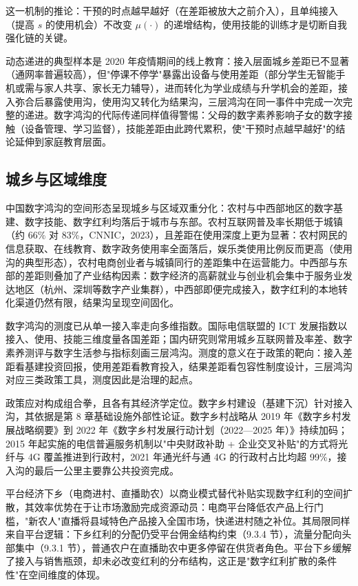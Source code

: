 这一机制的推论：干预的时点越早越好（在差距被放大之前介入），且单纯接入（提高 $s$ 的使用机会）不改变 $\mu(\cdot)$ 的递增结构，使用技能的训练才是切断自我强化链的关键。

动态递进的典型样本是 2020 年疫情期间的线上教育：接入层面城乡差距已不显著（通网率普遍较高），但"停课不停学"暴露出设备与使用差距（部分学生无智能手机或需与家人共享、家长无力辅导），进而转化为学业成绩与升学机会的差距，接入弥合后暴露使用沟，使用沟又转化为结果沟，三层鸿沟在同一事件中完成一次完整的递进。数字鸿沟的代际传递同样值得警惕：父母的数字素养影响子女的数字接触（设备管理、学习监督），技能差距由此跨代累积，使"干预时点越早越好"的结论延伸到家庭教育层面。

\subsection{城乡与区域维度}

中国数字鸿沟的空间形态呈现城乡与区域双重分化：农村与中西部地区的数字基建、数字技能、数字红利均落后于城市与东部。农村互联网普及率长期低于城镇（约 66\% 对 83\%，CNNIC，2023），且差距在使用深度上更为显著：农村网民的信息获取、在线教育、数字政务使用率全面落后，娱乐类使用比例反而更高（使用沟的典型形态），农村电商创业者与城镇同行的差距集中在运营能力。中西部与东部的差距则叠加了产业结构因素：数字经济的高薪就业与创业机会集中于服务业发达地区（杭州、深圳等数字产业集群），中西部即便完成接入，数字红利的本地转化渠道仍然有限，结果沟呈现空间固化。

数字鸿沟的测度已从单一接入率走向多维指数。国际电信联盟的 ICT 发展指数以接入、使用、技能三维度量各国差距；国内研究则常用城乡互联网普及率差、数字素养测评与数字生活参与指标刻画三层鸿沟。测度的意义在于政策的靶向：接入差距看基建投资回报，使用差距看教育投入，结果差距看包容性制度设计，三层鸿沟对应三类政策工具，测度因此是治理的起点。

政策应对构成组合拳，且各有其经济学定位。数字乡村建设（基建下沉）针对接入沟，其依据是第 8 章基础设施外部性论证。数字乡村战略从 2019 年《数字乡村发展战略纲要》到 2022 年《数字乡村发展行动计划（2022—2025 年）》持续加码；2015 年起实施的电信普遍服务机制以"中央财政补助 + 企业交叉补贴"的方式将光纤与 4G 覆盖推进到行政村，2021 年通光纤与通 4G 的行政村占比均超 99\%，接入沟的最后一公里主要靠公共投资完成。

平台经济下乡（电商进村、直播助农）以商业模式替代补贴实现数字红利的空间扩散，其效率优势在于让市场激励完成资源动员：电商平台降低农产品上行门槛，"新农人"直播将县域特色产品接入全国市场，快递进村随之补位。其局限同样来自平台逻辑：下乡红利的分配仍受平台佣金结构约束（9.3.4 节），流量分配向头部集中（9.3.1 节），普通农户在直播助农中更多停留在供货者角色。平台下乡缓解了接入与销售瓶颈，却未必改变红利的分布结构，这正是"数字红利扩散的条件性"在空间维度的体现。

